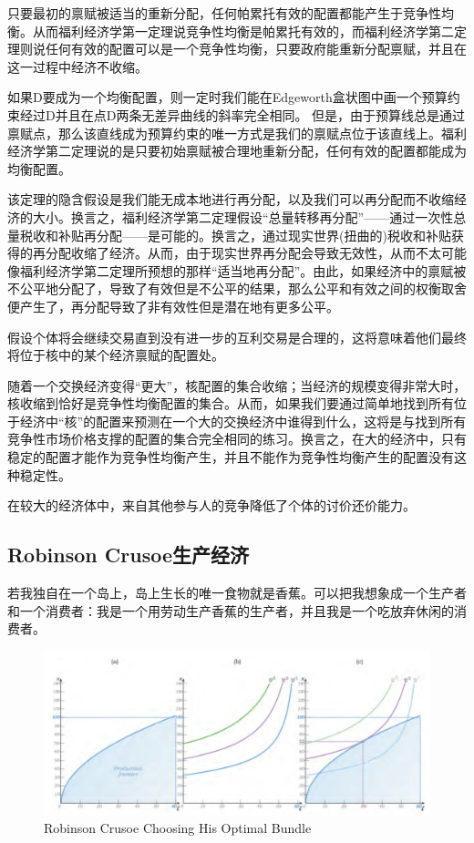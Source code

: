 \documentclass{article}
\begin{document}
只要最初的禀赋被适当的重新分配，任何帕累托有效的配置都能产生于竞争性均衡。从而福利经济学第一定理说竞争性均衡是帕累托有效的，而福利经济学第二定理则说任何有效的配置可以是一个竞争性均衡，只要政府能重新分配禀赋，并且在这一过程中经济不收缩。

如果D要成为一个均衡配置，则一定时我们能在Edgeworth盒状图中画一个预算约束经过D并且在点D两条无差异曲线的斜率完全相同。 但是，由于预算线总是通过禀赋点，那么该直线成为预算约束的唯一方式是我们的禀赋点位于该直线上。福利经济学第二定理说的是只要初始禀赋被合理地重新分配，任何有效的配置都能成为均衡配置。

该定理的隐含假设是我们能无成本地进行再分配，以及我们可以再分配而不收缩经济的大小。换言之，福利经济学第二定理假设“总量转移再分配”——通过一次性总量税收和补贴再分配——是可能的。换言之，通过现实世界(扭曲的)税收和补贴获得的再分配收缩了经济。从而，由于现实世界再分配会导致无效性，从而不太可能像福利经济学第二定理所预想的那样“适当地再分配”。由此，如果经济中的禀赋被不公平地分配了，导致了有效但是不公平的结果，那么公平和有效之间的权衡取舍便产生了，再分配导致了非有效性但是潜在地有更多公平。

假设个体将会继续交易直到没有进一步的互利交易是合理的，这将意味着他们最终将位于核中的某个经济禀赋的配置处。

随着一个交换经济变得“更大”，核配置的集合收缩；当经济的规模变得非常大时，核收缩到恰好是竞争性均衡配置的集合。从而，如果我们要通过简单地找到所有位于经济中“核”的配置来预测在一个大的交换经济中谁得到什么，这将是与找到所有竞争性市场价格支撑的配置的集合完全相同的练习。换言之，在大的经济中，只有稳定的配置才能作为竞争性均衡产生，并且不能作为竞争性均衡产生的配置没有这种稳定性。

在较大的经济体中，来自其他参与人的竞争降低了个体的讨价还价能力。

\subsection{Robinson Crusoe生产经济}

若我独自在一个岛上，岛上生长的唯一食物就是香蕉。可以把我想象成一个生产者和一个消费者：我是一个用劳动生产香蕉的生产者，并且我是一个吃放弃休闲的消费者。



\begin{figure}[H] %
	\centering %
	\includegraphics[width=1\textwidth]{16_4} %
	\caption{Robinson Crusoe Choosing His Optimal Bundle} %
	\label{Fig.main5} %
\end{figure}
\end{document}
